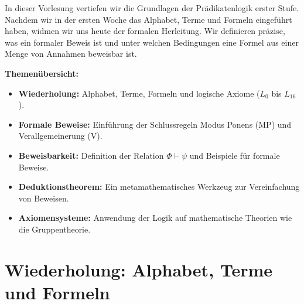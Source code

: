 


\begin{nice-box}
In dieser Vorlesung vertiefen wir die Grundlagen der Prädikatenlogik erster Stufe. Nachdem wir in der ersten Woche das Alphabet, Terme und Formeln eingeführt haben, widmen wir uns heute der formalen Herleitung. Wir definieren präzise, was ein formaler Beweis ist und unter welchen Bedingungen eine Formel aus einer Menge von Annahmen beweisbar ist.

\textbf{Themenübersicht:}
\begin{itemize}
    \item \textbf{Wiederholung:} Alphabet, Terme, Formeln und logische Axiome ($L_0$ bis $L_{16}$).
    \item \textbf{Formale Beweise:} Einführung der Schlussregeln Modus Ponens (MP) und Verallgemeinerung (V).
    \item \textbf{Beweisbarkeit:} Definition der Relation $\Phi \vdash \psi$ und Beispiele für formale Beweise.
    \item \textbf{Deduktionstheorem:} Ein metamathematisches Werkzeug zur Vereinfachung von Beweisen.
    \item \textbf{Axiomensysteme:} Anwendung der Logik auf mathematische Theorien wie die Gruppentheorie.
\end{itemize}
\end{nice-box}

\section{Wiederholung: Alphabet, Terme und Formeln}

